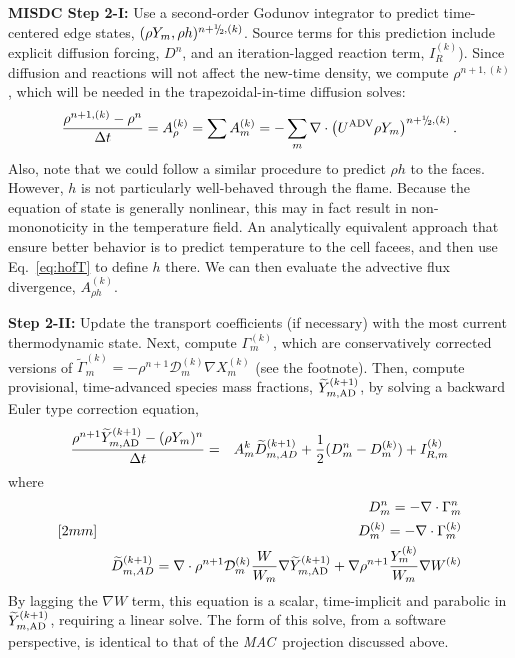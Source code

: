 {\bf MISDC Step 2-I:} Use a second-order Godunov integrator to predict
time-centered edge states, $(\rho Y_m,\rho h)^{n+\myhalf,(k)}$.  Source terms for this prediction include
explicit diffusion forcing, $D^{n}$, and an iteration-lagged reaction term, $I_R^{(k)}$).
Since diffusion and reactions will not affect the new-time density, we compute $\rho^{n+1,(k)}$, which will be needed in
the trapezoidal-in-time diffusion solves:
\begin{equation}
  \frac{\rho^{n+1,(k)} - \rho^n}{\Delta t} = A_{\rho}^{(k)} = \sum A_{m}^{(k)}
  = -\sum_m\nabla\cdot\left(\uadv\rho Y_m\right)^{n+\myhalf,(k)}.
\end{equation}
Also, note that we could follow a similar procedure to predict $\rho h$ to the faces.  However, $h$ is not particularly well-behaved through the flame.  Because the equation of state is generally nonlinear, this may in fact result in non-mononoticity in the temperature field. An analytically equivalent approach that ensure better behavior is to predict temperature to the cell facees, and then use Eq.~\ref{eq:hofT} to define $h$ there. We can then evaluate the advective flux divergence, $A_{\rho h}^{(k)}$.


{\bf Step 2-II:} Update the transport coefficients (if necessary) with the most current thermodynamic state.
Next, compute $\Gamma_m^{(k)}$, which are conservatively corrected versions of 
$\widetilde\Gamma_m^{(k)} = - \rho^{n+1}\mathcal D_m^{(k)}\nabla X_m^{(k)}$ (see the footnote).
Then, compute provisional, time-advanced species mass fractions, $\widetilde Y_{m,{\rm AD}}^{(k+1)}$, by solving a backward Euler type
correction equation,
\begin{eqnarray}
  \frac{\rho^{n+1}\widetilde Y_{m,{\rm AD}}^{(k+1)} - (\rho Y_m)^n}{\Delta t}
  &=& A_m^{{k}} \widetilde D_{m,AD}^{(k+1)} + \frac{1}{2}(D_m^n - D_m^{(k)}) + I_{R,m}^{(k)}
\end{eqnarray}
where
\begin{eqnarray*}
  &&D_m^n = - \nabla \cdot \Gamma_m^n\\ [2mm]
  &&D_m^{(k)} = - \nabla \cdot \Gamma_m^{(k)}\\
  &&\widetilde D_{m,AD}^{(k+1)} = \nabla \cdot \rho^{n+1}\mathcal D_m^{(k)}\frac{W}{W_m}\nabla\widetilde Y_{m,{\rm AD}}^{(k+1)} +
  \nabla \rho^{n+1}\frac{Y_m^{(k)}}{W_m} \nabla W^{(k)}
\end{eqnarray*}
By lagging the $\nabla W$ term, this equation is a scalar, time-implicit and parabolic in
$\widetilde Y_{m,{\rm AD}}^{(k+1)}$, requiring
a linear solve.  The form of this solve, from a software perspective, is identical to that of the \textit{MAC}\ projection
discussed above.

